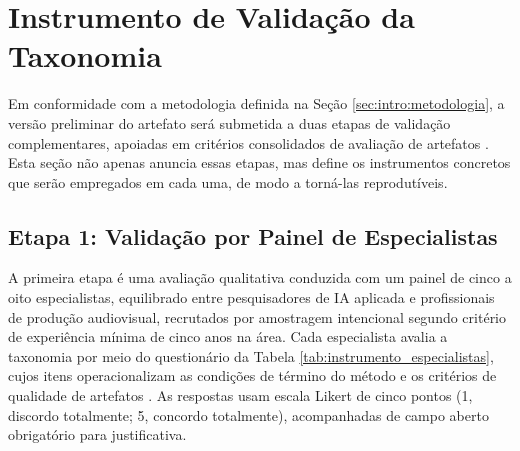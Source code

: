 \section{Instrumento de Validação da Taxonomia}
\label{sec:tax:validacao}

Em conformidade com a metodologia definida na Seção \ref{sec:intro:metodologia}, a versão preliminar do artefato será submetida a duas etapas de validação complementares, apoiadas em critérios consolidados de avaliação de artefatos \citep{prat2015, hevner2004}. Esta seção não apenas anuncia essas etapas, mas define os instrumentos concretos que serão empregados em cada uma, de modo a torná-las reprodutíveis.

\subsection{Etapa 1: Validação por Painel de Especialistas}

A primeira etapa é uma avaliação qualitativa conduzida com um painel de cinco a oito especialistas, equilibrado entre pesquisadores de IA aplicada e profissionais de produção audiovisual, recrutados por amostragem intencional segundo critério de experiência mínima de cinco anos na área. Cada especialista avalia a taxonomia por meio do questionário da Tabela \ref{tab:instrumento_especialistas}, cujos itens operacionalizam as condições de término do método \citep{nickerson2013method} e os critérios de qualidade de artefatos \citep{prat2015, szopinski2019}. As respostas usam escala Likert de cinco pontos (1, discordo totalmente; 5, concordo totalmente), acompanhadas de campo aberto obrigatório para justificativa.

